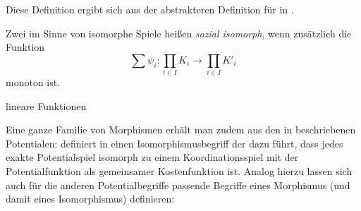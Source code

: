 \begin{bem}\label{bem:LapMorDef}
	Diese Definition ergibt sich aus der abstrakteren Definition für  in \cite{LapGameCat}. 
	
\end{bem}

\begin{defn}
	Zwei im Sinne von  isomorphe Spiele heißen \emph{sozial isomorph}, wenn zusätzlich die Funktion
		\[\sum \psi_i: \prod_{i \in I}K_i \to \prod_{i \in I} K'_i \]
	monoton ist. 
\end{defn}

\begin{bsp}
	lineare Funktionen
\end{bsp}	

Eine ganze Familie von Morphismen erhält man zudem aus den in  beschriebenen Potentialen: \citeauthor{ReprOfFiniteGamesAsNCG} definiert in \cite{ReprOfFiniteGamesAsNCG} einen Isomorphismusbegriff der dazu führt, dass jedes exakte Potentialspiel isomorph zu einem Koordinationsspiel mit der Potentialfunktion als gemeinsamer Kostenfunktion ist. Analog hierzu lassen sich auch für die anderen Potentialbegriffe passende Begriffe eines Morphismus (und damit eines Isomorphismus) definieren:

